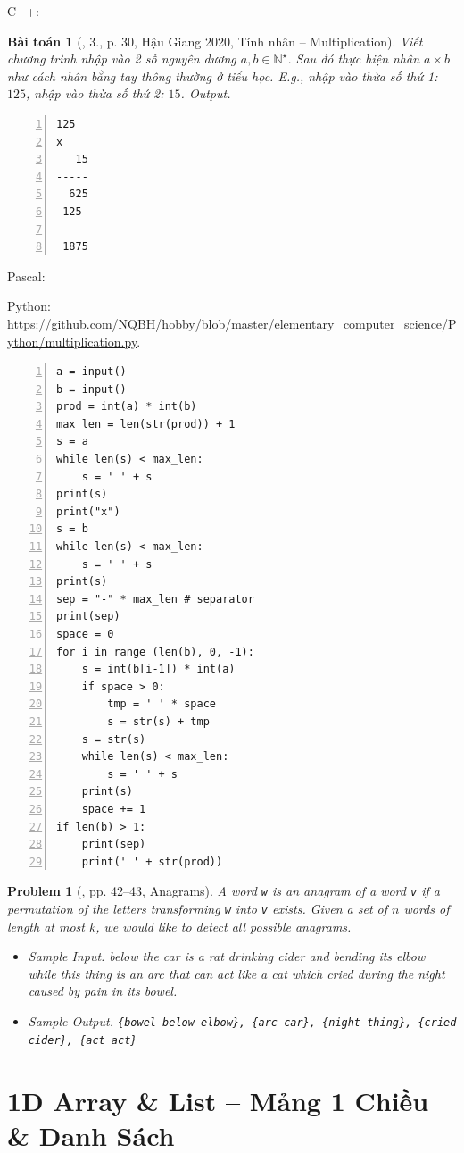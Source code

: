 \documentclass{article}
\newtheorem{baitoan}{Bài toán}
\newtheorem{problem}{Problem}
\begin{document}
C++:

\begin{baitoan}[\cite{VietSTEM2021}, 3., p. 30, Hậu Giang 2020, Tính nhân -- Multiplication]
	Viết chương trình nhập vào 2 số nguyên dương $a,b\in\mathbb{N}^\star$. Sau đó thực hiện nhân $a\times b$ như cách nhân bằng tay thông thường ở tiểu học. E.g., nhập vào thừa số thứ 1: $125$, nhập vào thừa số thứ 2: $15$. {\sf Output.}
	\begin{Verbatim}[numbers=left,xleftmargin=5mm]
  125
x
   15
-----
  625
 125
-----
 1875
	\end{Verbatim}
\end{baitoan}
\noindent Pascal:

Python: \url{https://github.com/NQBH/hobby/blob/master/elementary_computer_science/Python/multiplication.py}.
\begin{Verbatim}[numbers=left,xleftmargin=5mm]
a = input()
b = input()
prod = int(a) * int(b)
max_len = len(str(prod)) + 1
s = a
while len(s) < max_len:
    s = ' ' + s
print(s)
print("x")
s = b
while len(s) < max_len:
    s = ' ' + s
print(s)
sep = "-" * max_len # separator
print(sep)
space = 0
for i in range (len(b), 0, -1):
    s = int(b[i-1]) * int(a)
    if space > 0:
        tmp = ' ' * space
        s = str(s) + tmp
    s = str(s)
    while len(s) < max_len:
        s = ' ' + s
    print(s)
    space += 1
if len(b) > 1:
    print(sep)
    print(' ' + str(prod))
\end{Verbatim}

\begin{problem}[\cite{Durr_Vie2021}, pp. 42--43, Anagrams]
	A word {\tt w} is an \emph{anagram} of a word {\tt v} if a permutation of the letters transforming {\tt w} into {\tt v} exists. Given a set of $n$ words of length at most $k$, we would like to detect all possible anagrams.
	\begin{itemize}
		\item {\sf Sample Input.} below the car is a rat drinking cider and bending its elbow while this thing is an arc that can act like a cat which cried during the night caused by pain in its bowel.
		\item {\sf Sample Output.} \verb|{bowel below elbow}, {arc car}, {night thing}, {cried cider}, {act act}|
	\end{itemize}
\end{problem}


\section{1D Array \& List -- Mảng 1 Chiều \& Danh Sách}
\end{document}
